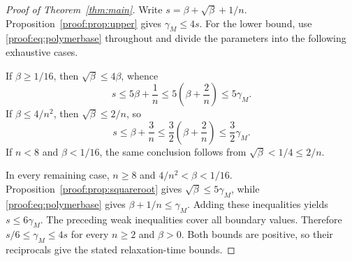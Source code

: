 \begin{proof}[Proof of Theorem~\ref{thm:main}]
Write $s=\beta+\sqrt\beta+1/n$. Proposition~\ref{proof:prop:upper}
gives $\gamma_M\leq4s$. For the lower bound, use
\eqref{proof:eq:polymerbase} throughout and divide the parameters
into the following exhaustive cases.

If $\beta\geq1/16$, then $\sqrt\beta\leq4\beta$, whence
\[
 s\leq5\beta+\frac1n
 \leq5\left(\beta+\frac2n\right)\leq5\gamma_M.
\]
If $\beta\leq4/n^2$, then $\sqrt\beta\leq2/n$, so
\[
 s\leq\beta+\frac3n
 \leq\frac32\left(\beta+\frac2n\right)
 \leq\frac32\gamma_M.
\]
If $n<8$ and $\beta<1/16$, the same conclusion follows from
$\sqrt\beta<1/4\leq2/n$.

In every remaining case, $n\geq8$ and
$4/n^2<\beta<1/16$. Proposition~\ref{proof:prop:squareroot} gives
$\sqrt\beta\leq5\gamma_M$, while
\eqref{proof:eq:polymerbase} gives $\beta+1/n\leq\gamma_M$.
Adding these inequalities yields $s\leq6\gamma_M$.
The preceding weak inequalities cover all boundary values.
Therefore $s/6\leq\gamma_M\leq4s$ for every $n\geq2$ and
$\beta>0$. Both bounds are positive, so their reciprocals give the
stated relaxation-time bounds.
\end{proof}
